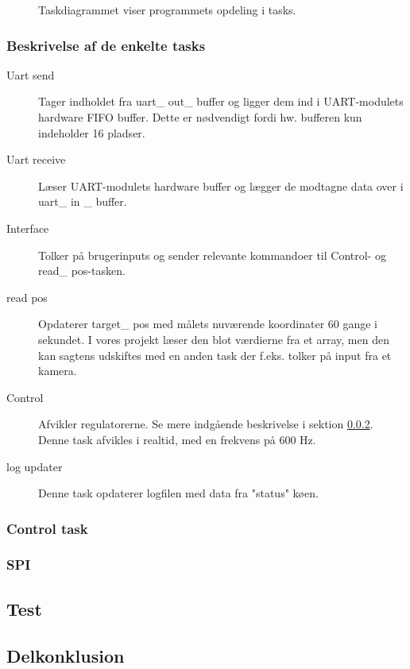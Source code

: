 \begin{figure}[!h]
\centering
\begin{tikzpicture}[node distance = 3.2cm]
	
\end{tikzpicture}
\caption[Task diagram]{Taskdiagrammet viser programmets opdeling i tasks.}
\label{fig:task_diagram}
\end{figure}

\subsubsection{Beskrivelse af de enkelte tasks}
\begin{description}
	\item[Uart send] Tager indholdet fra uart\_ out\_ buffer og ligger dem ind i UART-modulets hardware FIFO buffer. Dette er nødvendigt fordi hw. bufferen kun indeholder 16 pladser. \citep[Side. 430]{lm3s6965}
	\item[Uart receive] Læser UART-modulets hardware buffer og lægger de modtagne data over i uart\_ in \_ buffer. 
	\item[Interface] Tolker på brugerinputs og sender relevante kommandoer til Control- og read\_ pos-tasken.
	\item[read pos] Opdaterer target\_ pos med målets nuværende koordinater 60 gange i sekundet. I vores projekt læser den blot værdierne fra et array, men den kan sagtens udskiftes med en anden task der f.eks. tolker på input fra et kamera.
	\item[Control] Afvikler regulatorerne. Se mere indgående beskrivelse i sektion \ref{sec:control_task}. Denne task afvikles i realtid, med en frekvens på 600 Hz. 
	\item[log updater] Denne task opdaterer logfilen  med data fra "status" køen.
\end{description}




\subsubsection{Control task}
\label{sec:control_task}

\subsubsection{SPI}
\label{sec:spi-implementering}

\subsection{Test} 
% 





\subsection{Delkonklusion}

